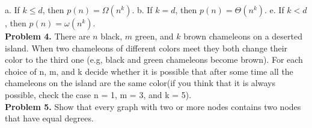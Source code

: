 \documentclass[11pt]{article}
\begin{document}
\newline \newline
a. If $k \leq d$, then $p(n) = \Omega(n^k)$.
\newline \newline
b. If $k = d$, then $p(n) = \Theta(n^k)$.
\newline \newline
e. If $k < d$, then $p(n) = \omega(n^k)$.\\

{\bf Problem 4.} There are $n$ black, $m$ green, and $k$ brown chameleons on a deserted island. When two chameleons of different colors meet they both change their color to the third one (e.g, black and green chameleons become brown). For each choice of n, m, and k  decide whether it is possible that after some time all the chameleons on the island are the same color(if you think that it is always possible, check the case n = 1, m = 3, and k = 5).\\

{\bf Problem 5.} Show that every graph with two or more nodes contains two nodes that have equal degrees.\\
\end{document}
